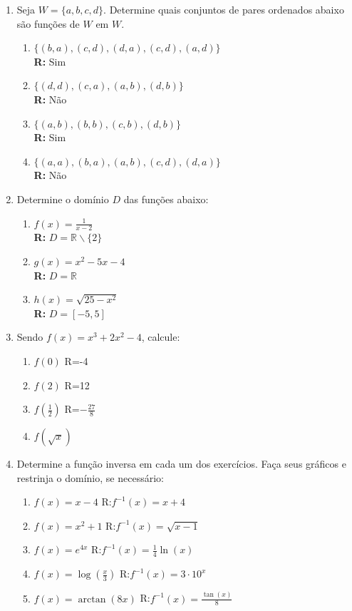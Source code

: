 \documentclass[oneside,a4paper,12pt]{article}
\begin{document}
\begin{enumerate}
	\item Seja $W = \{a,b,c,d\}$. Determine quais conjuntos de pares ordenados abaixo são funções de $W$ em $W$.
	\begin{enumerate}
		\item $\{(b,a),(c,d),(d,a),(c,d),(a,d)\}$ \\ {\bf R: }Sim
		\item $\{(d,d),(c,a),(a,b),(d,b)\}$ \\ {\bf R:} Não
		\item $\{(a,b),(b,b),(c,b),(d,b)\}$ \\ {\bf R:} Sim
		\item $\{(a,a),(b,a),(a,b),(c,d),(d,a)\}$ \\ {\bf R:} Não
	\end{enumerate}
	
	\item Determine o domínio $D$ das funções abaixo:
	\begin{enumerate}
		\item $f(x) = \frac{1}{x-2}$ \\ {\bf R:} $D = \mathbb{R}\backslash\{2\}$
		\item $g(x) = x^2 - 5x -4$ \\ {\bf R:} $D = \mathbb{R}$
		\item $h(x) = \sqrt{25 - x^2}$ \\ {\bf R:} $D = [-5,5]$
	\end{enumerate}
	
	\item Sendo $f(x) = x^{3} + 2x^2 - 4$, calcule:
	\begin{multicols}{2}
		\begin{enumerate}
			\item $f(0)$ R=-4
			\item $f(2)$ R=12
			\item $f(\frac{1}{2})$ R=$-\frac{27}{8}$
			\item $f(\sqrt{x})$
		\end{enumerate}
	\end{multicols}
	
	\item Determine a função inversa em cada um dos exercícios. Faça seus gráficos e restrinja o domínio, se necessário:
	\begin{multicols}{2}
		\begin{enumerate}
			\item $f(x) = x -4$ R:$f^{-1}(x) = x + 4$
			\item $f(x) = x^2 + 1$ R:$f^{-1}(x) = \sqrt{x-1}$
			\item $f(x) = e^{4x}$ R:$f^{-1}(x) = \frac{1}{4}\ln(x)$
			\item $f(x) = \log(\frac{x}{3})$ R:$f^{-1}(x)=3 \cdot 10^x$
			\item $f(x) = \arctan(8x)$ R:$f^{-1}(x) = \frac{\tan(x)}{8}$
		\end{enumerate}
	\end{multicols}
	

\end{enumerate}
\end{document}
